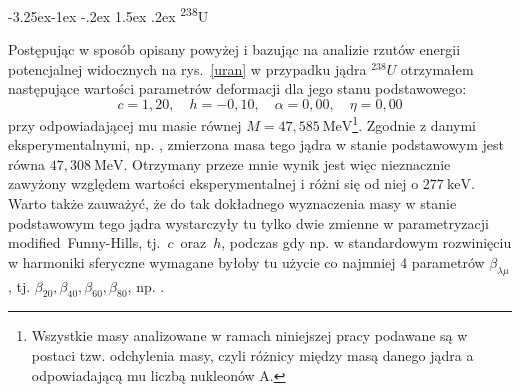 \documentclass[a4paper,polish]{article}
\makeatletter
\renewcommand\subsubsection{\@startsection{subsubsection}{3}{\z@}%
	{-3.25ex\@plus -1ex \@minus -.2ex}%
	{1.5ex \@plus .2ex}%
	{\normalfont\normalsize\bfseries\boldmath}}
\numberwithin{equation}{section}
\makeatother
\begin{document}
\clearpage
\subsubsection{\textsuperscript{238}U}

Postępując w sposób opisany powyżej i bazując na analizie rzutów energii potencjalnej widocznych na rys.~\ref{uran} w przypadku jądra $^{238}U$ otrzymałem następujące wartości parametrów deformacji dla jego stanu podstawowego:
\begin{equation*}
c=1,20, \quad h=-0,10, \quad \alpha=0,00, \quad \eta= 0,00
\end{equation*}
przy odpowiadającej mu masie równej $M=47,585~\mathrm{MeV}$\footnote{Wszystkie masy analizowane w ramach niniejszej pracy podawane są w postaci tzw. odchylenia masy, czyli różnicy między masą danego jądra a odpowiadającą mu liczbą nukleonów A.}. Zgodnie z danymi eksperymentalnymi, np. \cite{brookhaven}, zmierzona masa tego jądra w stanie podstawowym jest równa $47,308~\mathrm{MeV}$. Otrzymany przeze mnie wynik jest więc nieznacznie zawyżony względem wartości eksperymentalnej i różni się od niej o $277~\mathrm{keV}$. Warto także zauważyć, że do tak dokładnego wyznaczenia masy w stanie podstawowym tego jądra wystarczyły tu tylko dwie zmienne w parametryzacji \mbox{modified Funny-Hills}, \mbox{tj. $c$ oraz $h$}, podczas gdy np. w standardowym rozwinięciu w harmoniki sferyczne wymagane byłoby tu użycie co najmniej 4 parametrów $\beta_{\lambda \mu}$, tj. $\beta_{20},\beta_{40},\beta_{60},\beta_{80}$, np. \cite{JACHBF}.
\end{document}
